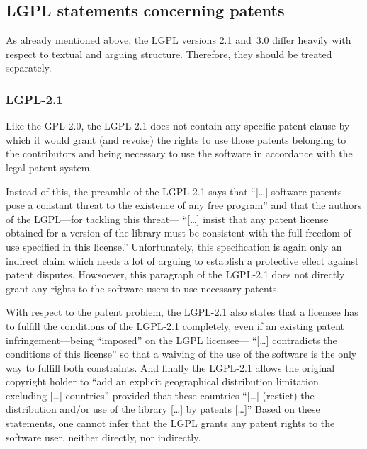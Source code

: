 \subsection{LGPL statements concerning patents}

As already mentioned above, the LGPL versions 2.1 and~3.0 differ heavily with
respect to textual and arguing structure. Therefore, they should be treated
separately.

\subsubsection{LGPL-2.1}

Like the GPL-2.0, the LGPL-2.1 does not contain any specific patent clause by
which it would grant (and revoke) the rights to use those patents belonging to
the contributors and being necessary to use the software in accordance with the
legal patent system.

Instead of this, the preamble of the LGPL-2.1 says that \enquote{[\ldots]
software patents pose a constant threat to the existence of any free program}
and that the authors of the LGPL---for tackling this threat---%
\enquote{[\ldots] insist that any patent license obtained for a version of the
library must be consistent with the full freedom of use specified in this
license.}
Unfortunately, this specification is again only an indirect claim which needs a
lot of arguing to establish a protective effect against patent disputes.
Howsoever, this paragraph of the LGPL-2.1 does not directly grant any rights to
the software users to use necessary patents.

With respect to the patent problem, the LGPL-2.1 also states that a licensee has
to fulfill the conditions of the LGPL-2.1 completely, even if an existing patent
infringement---being \enquote{imposed} on the LGPL licensee---%
\enquote{[\ldots] contradicts the conditions of this license} so that a waiving
of the use of the software is the only way to fulfill both
constraints. And finally the LGPL-2.1 allows the original
copyright holder to \enquote{add an explicit geographical distribution limitation
excluding [\ldots] countries} provided that these countries \enquote{[\ldots]
(restict) the distribution and/or use of the library [\ldots] by patents
[\ldots]} Based on these statements, one cannot infer that 
the LGPL grants any patent rights to the software user, neither directly, nor
indirectly.

